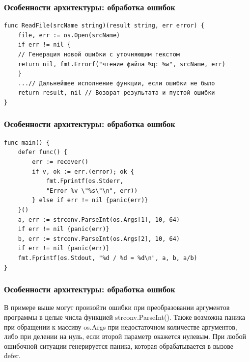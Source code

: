 \documentclass[11pt]{beamer}
\begin{document}
\begin{frame}[fragile]
\frametitle{Особенности архитектуры: обработка ошибок}
\begin{verbatim}
func ReadFile(srcName string)(result string, err error) {
    file, err := os.Open(srcName)
    if err != nil {
    // Генерация новой ошибки с уточняющим текстом
    return nil, fmt.Errorf("чтение файла %q: %w", srcName, err)
    }
    ...// Дальнейшее исполнение функции, если ошибки не было
    return result, nil // Возврат результата и пустой ошибки
}
\end{verbatim}
\end{frame}
\begin{frame}[fragile]
\frametitle{Особенности архитектуры: обработка ошибок}
\begin{verbatim}
func main() {
	defer func() {
		err := recover()
		if v, ok := err.(error); ok {
			fmt.Fprintf(os.Stderr, 
            "Error %v \"%s\"\n", err))
		} else if err != nil {panic(err)}
	}()
	a, err := strconv.ParseInt(os.Args[1], 10, 64)
	if err != nil {panic(err)}
	b, err := strconv.ParseInt(os.Args[2], 10, 64)
	if err != nil {panic(err)}
	fmt.Fprintf(os.Stdout, "%d / %d = %d\n", a, b, a/b)
}
\end{verbatim}
\end{frame}
\begin{frame}
\frametitle{Особенности архитектуры: обработка ошибок}
В примере выше могут произойти ошибки при преобразовании аргументов программы в целые числа функцией {\color{purple}strconv.ParseInt()}. Также возможна паника при обращении к массиву {\color{brown}os.Args} при недостаточном количестве аргументов, либо при делении на нуль, если второй параметр окажется нулевым. При любой ошибочной ситуации генерируется паника, которая обрабатывается в вызове {\color{purple}defer}.
\end{frame}
\end{document}
